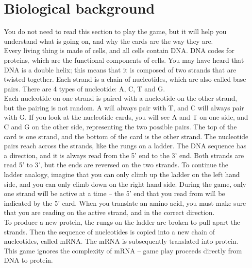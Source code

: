 \documentclass[a4paper,11pt,oneside]{memoir}
\begin{document}
\section*{Biological background}
\label{bio}

You do not need to read this section to play the game, but it will help you understand what is going on, and why the cards are the way they are.\\

Every living thing is made of cells, and all cells contain DNA.
DNA codes for proteins, which are the functional components of cells.
You may have heard that DNA is a double helix; this means that it is composed of two strands that are twisted together.
Each strand is a chain of nucleotides, which are also called base pairs.
There are 4 types of nucleotide: A, C, T and G.\\

Each nucleotide on one strand is paired with a nucleotide on the other strand, but the pairing is not random.
A will always pair with T, and C will always pair with G.  
If you look at the nucleotide cards, you will see A and T on one side, and C and G on the other side, representing the two possible pairs.
The top of the card is one strand, and the bottom of the card is the other strand.
The nucleotide pairs reach across the strands, like the rungs on a ladder.
The DNA sequence has a direction, and it is always read from the 5' end to the 3' end.
Both strands are read 5' to 3', but the ends are reversed on the two strands.
To continue the ladder analogy, imagine that you can only climb up the ladder on the left hand side, and you can only climb down on the right hand side.
During the game, only one strand will be active at a time -- the 5' end that you read from will be indicated by the 5' card.  
When you translate an amino acid, you must make sure that you are reading on the active strand, and in the correct direction. \\

To produce a new protein, the rungs on the ladder are broken to pull apart the strands.
Then the sequence of nucleotides is copied into a new chain of nucleotides, called mRNA.
The mRNA is subsequently translated into protein.
This game ignores the complexity of mRNA -- game play proceeds directly from DNA to protein.\\
\end{document}
